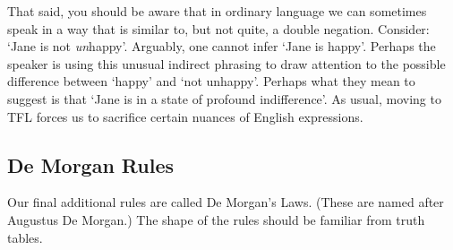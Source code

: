 \begin{pf}
\LEM
\open
\close
{}
\open
\close
{}
\end{pf}

That said, you should be aware that 
in ordinary language we can sometimes speak in a way that is similar to, but not quite, a double negation.
Consider: `Jane is not \emph{un}happy'. Arguably, one cannot infer `Jane is happy'.
Perhaps the speaker is using this unusual indirect phrasing to draw attention to the possible difference between `happy' and `not unhappy'.
Perhaps what they mean to suggest is that
`Jane is in a state of profound indifference'. As usual, moving to TFL forces us to sacrifice certain nuances of English expressions.

%
%
\subsection{De Morgan Rules}
Our final additional rules are called De Morgan's Laws. (These are named after Augustus De Morgan.) The shape of the rules should be familiar from truth tables.

